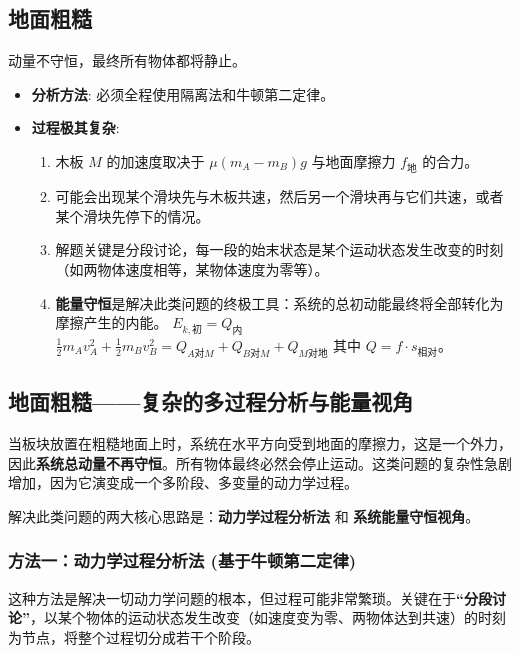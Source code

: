 \documentclass[a4paper,11pt]{ctexart}
\begin{document}
\subsection{地面粗糙}
动量不守恒，最终所有物体都将静止。
\begin{itemize}
    \item \textbf{分析方法}: 必须全程使用隔离法和牛顿第二定律。
    \item \textbf{过程极其复杂}:
        \begin{enumerate}
            \item 木板 $M$ 的加速度取决于 $\mu(m_A-m_B)g$ 与地面摩擦力 $f_{地}$ 的合力。
            \item 可能会出现某个滑块先与木板共速，然后另一个滑块再与它们共速，或者某个滑块先停下的情况。
            \item \textcolor{HighlightColor}{解题关键是分段讨论}，每一段的始末状态是某个运动状态发生改变的时刻（如两物体速度相等，某物体速度为零等）。
            \item \textbf{能量守恒}是解决此类问题的终极工具：系统的总初动能最终将全部转化为摩擦产生的内能。
            $E_{k,初} = Q_{内}$
            $\frac{1}{2}m_A v_A^2 + \frac{1}{2}m_B v_B^2 = Q_{A对M} + Q_{B对M} + Q_{M对地}$
            其中 $Q = f \cdot s_{相对}$。
        \end{enumerate}
\end{itemize}

\subsection{地面粗糙——复杂的多过程分析与能量视角}
\label{sec:case4_rough}

当板块放置在粗糙地面上时，系统在水平方向受到地面的摩擦力，这是一个外力，因此\textbf{系统总动量不再守恒}。所有物体最终必然会停止运动。这类问题的复杂性急剧增加，因为它演变成一个\textcolor{HighlightColor}{多阶段、多变量的动力学过程}。

解决此类问题的两大核心思路是：\textbf{动力学过程分析法} 和 \textbf{系统能量守恒视角}。

\subsubsection{方法一：动力学过程分析法 (基于牛顿第二定律)}
这种方法是解决一切动力学问题的根本，但过程可能非常繁琐。关键在于\textbf{“分段讨论”}，以某个物体的运动状态发生改变（如速度变为零、两物体达到共速）的时刻为节点，将整个过程切分成若干个阶段。
\end{document}
